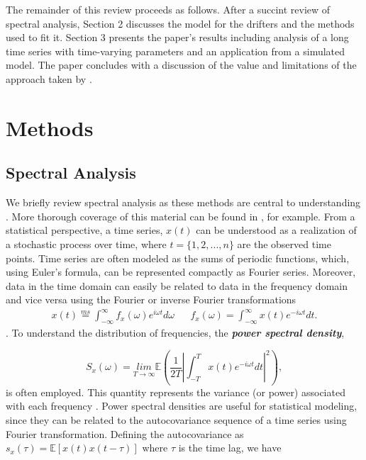\documentclass{stat572Style}
\begin{document}
\indent The remainder of this review proceeds as follows. After a succint review of spectral analysis, Section 2 discusses the model for the drifters and the methods used to fit it. Section 3 presents the paper's results including analysis of a long time series with time-varying parameters and an application from a simulated model. The paper concludes with a discussion of the value and limitations of the approach taken by \citet{Sykulski2016}. 
\section{Methods}
			

	\subsection{Spectral Analysis}
	\indent We briefly review spectral analysis as these methods are central to understanding \citet{Sykulski2016}.  More thorough coverage of this material can be found in  \citep{Percival1993}, for example. From a statistical perspective, a time series, $x(t)$ can be understood as a realization of a stochastic process over time, where  $t = \{1,2,...,n\}$ are the observed time points.  Time series are often modeled as the sums of periodic functions, which, using Euler's formula, can be represented compactly as Fourier series. Moreover, data in the time domain can easily be related to data in the frequency domain and vice versa using the Fourier or inverse Fourier transformations 	\begin{align}
x(t) \overset{ms}{=} \int_{-\infty}^{\infty} f_{x}(\omega)e^{i\omega t}d\omega && f_{x}(\omega) = \int_{-\infty}^{\infty} x(t) e^{-i \omega t }dt.
\end{align}
\citep{Percival1993}. To understand the distribution of frequencies, the \textbf{\it{power spectral density}},


\begin{equation}
S_{x}(\omega) = \underset{T \rightarrow \infty}{lim} \mathbb{E} \left(\frac{1}{2T} \left| \int_{-T}^{T} x(t) e^{-i \omega t}dt \right|^{2} \right),
\end{equation}
is often employed. This quantity represents the variance (or power) associated with each frequency \citep{Percival1993}. Power spectral densities are useful for statistical modeling, since they can be related to the autocovariance sequence of a time series using  Fourier transformation.  Defining the autocovariance as $s_{x}(\tau) = \mathbb{E}[x(t) x(t - \tau)] $ where $\tau$ is the time lag, we have
\end{document}
